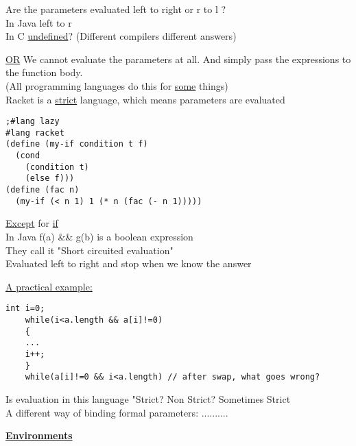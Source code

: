 \documentclass{article}
\begin{document}
\begin{flushleft}
Are the parameters evaluated left to right or r to l ?\\
In Java left to r\\
In C \underline{undefined}? (Different compilers different answers)
\end{flushleft}

\doublespacing
\begin{flushleft}
\underline{OR} We cannot evaluate the parameters at all. And simply pass the expressions to the function body.\\
(All programming languages do this for \underline{some} things)\\
Racket is a \underline{strict} language, which means parameters are evaluated 
\end{flushleft}

\begin{verbatim}
;#lang lazy
#lang racket
(define (my-if condition t f)
  (cond
    (condition t)
    (else f)))
(define (fac n)
  (my-if (< n 1) 1 (* n (fac (- n 1)))))
\end{verbatim}
%

\begin{flushleft}
\underline{Except} for \underline{if}\\
In Java f(a) \&\& g(b) is a boolean expression\\
They call it "Short circuited evaluation"\\
\color{red}Evaluated left to right and stop when we know the answer
\end{flushleft}

\doublespacing
\begin{flushleft}
\underline{A practical example:}
\end{flushleft}

\begin{verbatim}
int i=0;
	while(i<a.length && a[i]!=0)
	{
	...
	i++;
	}
	while(a[i]!=0 && i<a.length) // after swap, what goes wrong?
\end{verbatim}

\begin{flushleft}
Is evaluation in this language "Strict? Non Strict? Sometimes Strict\\
A different way of binding formal parameters: ..........
\end{flushleft}
\begin{center}
\textbf{\underline{Environments}}
\end{center}
\end{document}
